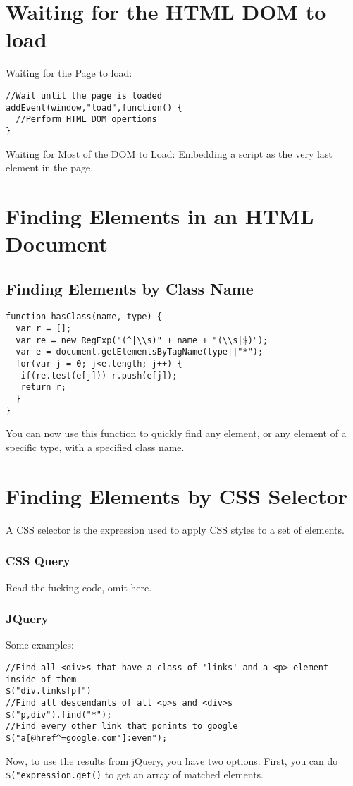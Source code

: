 \documentclass[a4paper,11pt]{book}
\begin{document}
\section{Waiting for the HTML DOM to load}
Waiting for the Page to load:
\begin{verbatim}
//Wait until the page is loaded
addEvent(window,"load",function() {
  //Perform HTML DOM opertions
}
\end{verbatim}
Waiting for Most of the DOM to Load: Embedding a script as the very last element
in the page.
\section{Finding Elements in an HTML Document}
\subsection{Finding Elements by Class Name}
\begin{verbatim}
function hasClass(name, type) {
  var r = [];
  var re = new RegExp("(^|\\s)" + name + "(\\s|$)");
  var e = document.getElementsByTagName(type||"*");
  for(var j = 0; j<e.length; j++) {
   if(re.test(e[j])) r.push(e[j]);
   return r;
  }
}
\end{verbatim}
You can now use this function to quickly find any element, or any element of a
specific type, with a specified class name.
\section{Finding Elements by CSS Selector}
A CSS selector is the expression used to apply CSS styles to a set of elements.
\subsubsection{CSS Query}
Read the fucking code, omit here.
\subsubsection{JQuery}
Some examples:
\begin{verbatim}
//Find all <div>s that have a class of 'links' and a <p> element inside of them
$("div.links[p]")
//Find all descendants of all <p>s and <div>s
$("p,div").find("*");
//Find every other link that ponints to google
$("a[@href^=google.com']:even");
\end{verbatim}
Now, to use the results from jQuery, you have two options. First, you can do
\verb|$("expression.get()| to get an array of matched elements.
\end{document}
